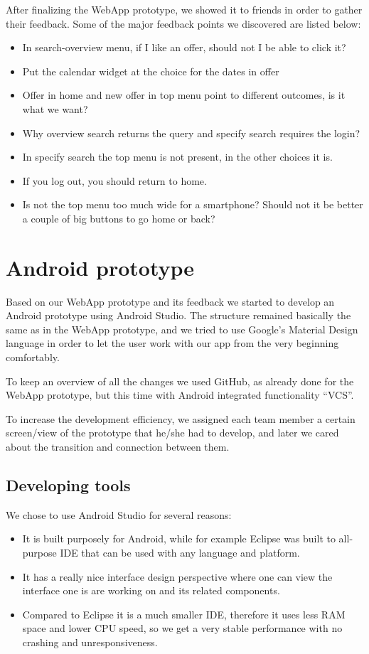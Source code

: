 \documentclass[11pt,twoside,a4paper]{report}
\begin{document}
After finalizing the WebApp prototype, we showed it to friends in order to gather their feedback. Some of the major feedback points we discovered are listed below:

\begin{itemize}
\item In search-overview menu, if I like an offer, should not I be able to click it?
\item Put the calendar widget at the choice for the dates in offer
\item Offer in home and new offer in top menu point to different outcomes, is it what we want?
\item Why overview search returns the query and specify search requires the login?
\item In specify search the top menu is not present, in the other choices it is.
\item If you log out, you should return to home.
\item Is not the top menu too much wide for a smartphone? Should not it be better a couple of big buttons to go home or back?
\end{itemize}

\chapter{Android prototype}

Based on our WebApp prototype and its feedback we started to develop an Android prototype using Android Studio. The structure remained basically the same as in the WebApp prototype, and we tried to use Google's Material Design language in order to let the user work with our app from the very beginning comfortably.

To keep an overview of all the changes we used GitHub, as already done for the WebApp prototype, but this time with Android integrated functionality ``VCS''.

To increase the development efficiency, we assigned each team member a certain screen/view of the prototype that he/she had to develop, and later we cared about the transition and connection between them.

\section{Developing tools}

We chose to use Android Studio for several reasons:

\begin{itemize}
\item It is built purposely for Android, while for example Eclipse was built to all-purpose IDE that can be used with any language and platform.
\item It has a really nice interface design perspective where one can view the interface one is are working on and its related components.
\item Compared to Eclipse it is a much smaller IDE, therefore it uses less RAM space and lower CPU speed, so we get a very stable performance with no crashing and unresponsiveness.
\end{itemize}
\end{document}
